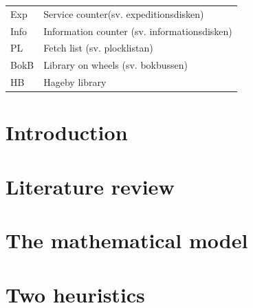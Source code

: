 \documentclass[a4paper, 10pt, twoside, openright]{book}
\begin{document}
\begin{tabular}{ll}
Exp		& Service counter(sv. expeditionsdisken) \\
Info	& Information counter (sv. informationsdisken)\\
PL		& Fetch list (sv. plocklistan)\\
BokB    & Library on wheels (sv. bokbussen)\\
HB      & Hageby library \\
\end{tabular}


\tableofcontents 
\begin{samepage}
\listoffigures
\let\clearpage\relax
\listoftables
\end{samepage}


\mainmatter


\chapter{Introduction}\label{chap:intro}



\chapter{Literature review}\label{chap:lit}



\chapter{The mathematical model}\label{chap:mathmod}



%
%

\chapter{Two heuristics}\label{chap:weekly}
\end{document}
